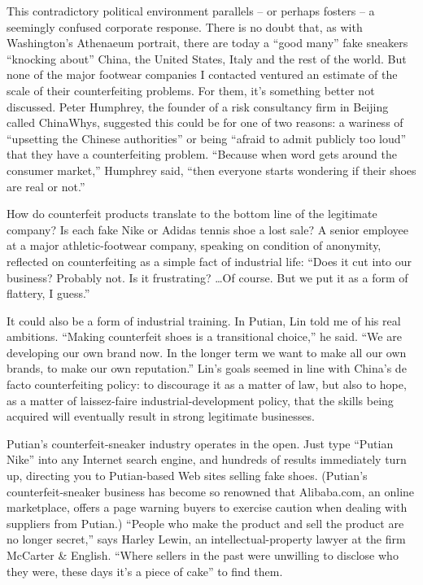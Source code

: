 ﻿\documentclass[12pt]{article}
\begin{document}
This contradictory political environment parallels -- or perhaps fosters -- a seemingly confused
corporate response. There is no doubt that, as with Washington's Athenaeum portrait, there are today
a ``good many'' fake sneakers ``knocking about'' China, the United States, Italy and the rest of the
world. But none of the major footwear companies I contacted ventured an estimate of the scale of
their counterfeiting problems. For them, it's something better not discussed. Peter Humphrey, the
founder of a risk consultancy firm in Beijing called ChinaWhys, suggested this could be for one of
two reasons: a wariness of ``upsetting the Chinese authorities'' or being ``afraid to admit publicly
too loud'' that they have a counterfeiting problem. ``Because when word gets around the consumer
market,'' Humphrey said, ``then everyone starts wondering if their shoes are real or not.''

How do counterfeit products translate to the bottom line of the legitimate company? Is each fake
Nike or Adidas tennis shoe a lost sale? A senior employee at a major athletic-footwear company,
speaking on condition of anonymity, reflected on counterfeiting as a simple fact of industrial life:
``Does it cut into our business? Probably not. Is it frustrating? \ldots Of course. But we put it as
a form of flattery, I guess.''

It could also be a form of industrial training. In Putian, Lin told me of his real ambitions.
``Making counterfeit shoes is a transitional choice,'' he said. ``We are developing our own brand
now. In the longer term we want to make all our own brands, to make our own reputation.'' Lin's
goals seemed in line with China's de facto counterfeiting policy: to discourage it as a matter of
law, but also to hope, as a matter of laissez-faire industrial-development policy, that the skills
being acquired will eventually result in strong legitimate businesses.

Putian's counterfeit-sneaker industry operates in the open. Just type ``Putian Nike'' into any
Internet search engine, and hundreds of results immediately turn up, directing you to Putian-based
Web sites selling fake shoes. (Putian's counterfeit-sneaker business has become so renowned that
Alibaba.com, an online marketplace, offers a page warning buyers to exercise caution when dealing
with suppliers from Putian.) ``People who make the product and sell the product are no longer
secret,'' says Harley Lewin, an intellectual-property lawyer at the firm McCarter \& English.
``Where sellers in the past were unwilling to disclose who they were, these days it's a piece of
cake'' to find them.
\end{document}
